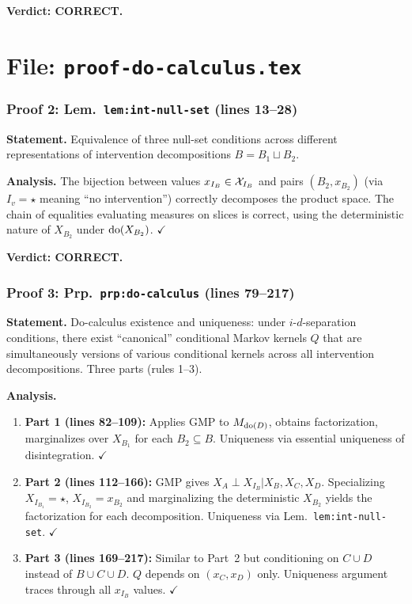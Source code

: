 \documentclass{article}
\begin{document}
\textbf{Verdict: CORRECT.}

\part*{File: \texttt{proof-do-calculus.tex}}

\section{Proof 2: Lem.\ \texttt{lem:int-null-set} (lines 13--28)}

\textbf{Statement.} Equivalence of three null-set conditions across different
representations of intervention decompositions $B=B_1\sqcup B_2$.

\textbf{Analysis.}
The bijection between values $x_{I_B}\in\mathcal{X}_{I_B}$ and pairs $(B_2,x_{B_2})$
(via $I_v=\star$ meaning ``no intervention'') correctly decomposes the
product space.  The chain of equalities evaluating measures on slices is correct,
using the deterministic nature of $X_{B_2}$ under $\operatorname{do}(X_{B_2})$.  $\checkmark$

\textbf{Verdict: CORRECT.}

\section{Proof 3: Prp.\ \texttt{prp:do-calculus} (lines 79--217)}

\textbf{Statement.} Do-calculus existence and uniqueness: under
$i$-$d$-separation conditions, there exist ``canonical'' conditional Markov
kernels $Q$ that are simultaneously versions of various conditional kernels
across all intervention decompositions.  Three parts (rules 1--3).

\textbf{Analysis.}
\begin{enumerate}[leftmargin=*]
  \item \textbf{Part 1 (lines 82--109):} Applies GMP to $M_{\operatorname{do}(D)}$,
    obtains factorization, marginalizes over $X_{B_1}$ for each $B_2\subseteq B$.
    Uniqueness via essential uniqueness of disintegration.  $\checkmark$
  \item \textbf{Part 2 (lines 112--166):} GMP gives $X_A\perp X_{I_B}|X_B,X_C,X_D$.
    Specializing $X_{I_{B_1}}=\star$, $X_{I_{B_2}}=x_{B_2}$ and marginalizing
    the deterministic $X_{B_2}$ yields the factorization for each decomposition.
    Uniqueness via Lem.\ \texttt{lem:int-null-set}.  $\checkmark$
  \item \textbf{Part 3 (lines 169--217):} Similar to Part~2 but conditioning
    on $C\cup D$ instead of $B\cup C\cup D$.  $Q$ depends on $(x_C,x_D)$
    only.  Uniqueness argument traces through all $x_{I_B}$ values.  $\checkmark$
\end{enumerate}
\end{document}
